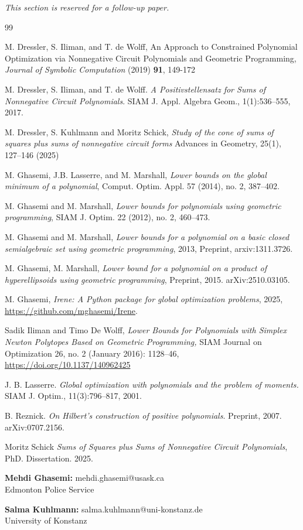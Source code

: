 \documentclass{article}
\begin{document}
\emph{This section is reserved for a follow-up paper.}

\begin{thebibliography}{99}

 M. Dressler, S. Iliman, and T. de Wolff, An Approach to Constrained Polynomial Optimization via Nonnegative Circuit Polynomials and Geometric Programming, \emph{Journal of Symbolic Computation} (2019) \textbf{91}, 149-172

 M. Dressler, S. Iliman, and T. de Wolff. \emph{A Positivstellensatz for Sums of Nonnegative Circuit Polynomials}. SIAM J. Appl. Algebra Geom., 1(1):536--555, 2017.

 M. Dressler, S. Kuhlmann and Moritz Schick, \emph{Study of the cone of sums of squares plus sums of nonnegative circuit forms} Advances in Geometry, 25(1), 127--146 (2025)

 M. Ghasemi, J.B. Lasserre, and M. Marshall, \emph{Lower bounds on the global minimum of a polynomial}, Comput. Optim. Appl. 57 (2014), no. 2, 387--402.

 M. Ghasemi and M. Marshall, \emph{Lower bounds for polynomials using geometric programming}, SIAM J. Optim. 22 (2012), no. 2, 460--473.

 M. Ghasemi and M. Marshall, \emph{Lower bounds for a polynomial on a basic closed semialgebraic set using geometric programming}, 2013, Preprint, arxiv:1311.3726.

 M. Ghasemi, M. Marshall,
\emph{Lower bound for a polynomial on a product of hyper\-ellipsoids using geometric programming},
\newblock Preprint, 2015.
\newblock arXiv:2510.03105.

 M. Ghasemi, \emph{Irene: A Python package for global optimization problems}, 2025, \url{https://github.com/mghasemi/Irene}.

 Sadik Iliman and Timo De Wolff, \emph{Lower Bounds for Polynomials with Simplex Newton Polytopes Based on Geometric Programming,} SIAM Journal on Optimization 26, no. 2 (January 2016): 1128--46, \url{https://doi.org/10.1137/140962425}

 J. B. Lasserre. \emph{Global optimization with polynomials and the problem of moments.} SIAM J. Optim., 11(3):796--817, 2001.

 B. Reznick.
\emph{On Hilbert's construction of positive poly\-nomials}.
\newblock Preprint, 2007.
\newblock arXiv:0707.2156.

 Moritz Schick \emph{Sums of Squares plus Sums of Nonnegative Circuit Polynomials}, PhD. Dissertation. 2025.

\end{thebibliography}

\bigskip

\noindent\textbf{Mehdi Ghasemi:} mehdi.ghasemi@usask.ca\\
Edmonton Police Service

\noindent\textbf{Salma Kuhlmann:} salma.kuhlmann@uni-konstanz.de\\
University of Konstanz
\end{document}
